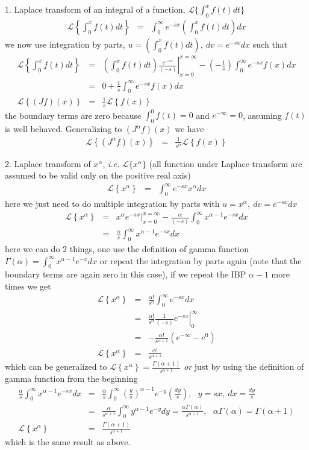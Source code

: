 \documentclass[aps,preprint,preprintnumbers,nofootinbib,showpacs,prd]{revtex4-1}
\newcommand{\ie}{{\it i.e.} }
\newcommand{\nbea}{\begin{eqnarray*}}
\newcommand{\neea}{\end{eqnarray*}}
\begin{document}
1. Laplace transform of an integral of a function, $\mathcal{L}\{\int_0^x f(t) dt\}$
\nbea
\mathcal{L}\left \{\int_0^x f(t) dt \right \} & = & \int_0^\infty e^{-sx} \left ( \int_0^x f(t) dt \right ) dx
\neea
we now use integration by parts, $u = \left ( \int_0^x f(t) dt \right ),~dv = e^{-sx} dx $ such that
\nbea
\mathcal{L}\left \{\int_0^x f(t) dt \right \} & = &  \left. \left ( \int_0^x f(t) dt \right ) \frac{e^{-sx}}{(-s)} \right |_{x = 0}^{x = \infty} - \left ( -\frac{1}{s} \right ) \int_0^\infty e^{-sx} f(x) dx \\
& = & 0 + \frac{1}{s} \int_0^\infty e^{-sx} f(x) dx \\
\mathcal{L}\left \{ (J f) (x) \right \} & = & \frac{1}{s}\mathcal{L}\left \{ f(x) \right \} 
\neea
the boundary terms are zero because $\int_0^0 f(t) = 0$ and $e^{-\infty}=0$, assuming $f(t)$ is well behaved. Generalizing to $(J^\alpha f)(x)$ we have
\nbea
\mathcal{L}\left \{ (J^\alpha f) (x) \right \} & = & \frac{1}{s^\alpha}\mathcal{L}\left \{ f(x) \right \} 
\neea

2. Laplace transform of $x^\alpha$, \ie $\mathcal{L}\{x^\alpha\}$ (all function under Laplace transform are assumed to be valid only on the positive real axis)
\nbea
\mathcal{L}\left \{x^\alpha\right \} & = & \int_0^\infty e^{-sx} x^\alpha dx
\neea
here we just need to do multiple integration by parts with $u = x^\alpha,~dv = e^{-sx} dx$
\nbea
\mathcal{L}\left \{x^\alpha\right \} & = &  \left. x^\alpha e^{-sx} \right |_{x=0}^{x=\infty} - \frac{\alpha}{(-s)}\int_0^\infty x^{\alpha-1} e^{-sx} dx \\
& = & \frac{\alpha}{s}\int_0^\infty x^{\alpha-1} e^{-sx} dx
\neea
here we can do 2 things, one use the definition of gamma function $\Gamma(\alpha) = \int_0^\infty x^{\alpha-1} e^{-x} dx$ or repeat the integration by parts again (note that the boundary terms are again zero in this case), if we repeat the IBP $\alpha-1$ more times we get
\nbea
\mathcal{L}\left \{x^\alpha\right \} & = & \frac{\alpha !}{s^\alpha}\int_0^\infty e^{-sx} dx \\
& = & \left. \frac{\alpha !}{s^\alpha} \frac{1}{(-s)} e^{-sx} \right |_{0}^{\infty} \\
& = & -\frac{\alpha !}{s^{\alpha+1}} \left ( e^{-\infty}- e^0\right ) \\
\mathcal{L}\left \{x^\alpha\right \}  & = & \frac{\alpha !}{s^{\alpha+1}}
\neea
which can be generalized to $\mathcal{L}\left \{x^\alpha\right \}  = \frac{\Gamma(\alpha+1)}{s^{\alpha+1}}$ {\it or} just by using the definition of gamma function from the beginning
\nbea
\frac{\alpha}{s}\int_0^\infty x^{\alpha-1} e^{-sx} dx & = & \frac{\alpha}{s}\int_0^\infty \left (\frac{y}{s}\right )^{\alpha-1} e^{-y} \left (\frac{dy}{s} \right), ~~~ y = sx,~ dx = \frac {dy}{s}\\
& = & \frac{\alpha}{s^{\alpha+1}}\int_0^\infty y^{\alpha-1} e^{-y} dy = \frac{\alpha \Gamma(\alpha)}{s^{\alpha+1}},~~~ \alpha \Gamma(\alpha) = \Gamma(\alpha+1)\\
\mathcal{L}\left \{x^\alpha\right \} & = & \frac{\Gamma(\alpha + 1)}{s^{\alpha+1}}
\neea
which is the same result as above.
\end{document}
